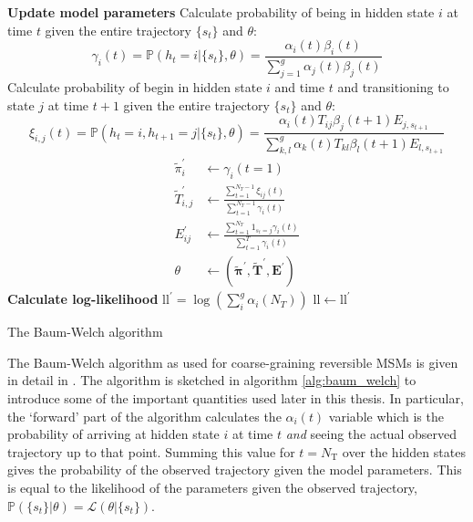 \begin{algorithm}
{{    \textbf{Update model parameters}\;
    Calculate probability of being in hidden state $i$ at time $t$ given the entire trajectory $\{s_{t}\}$ and  $\theta$:\;
    \begin{equation*}
    \gamma_{i}(t) = \mathbb{P}(h_t=i|\{s_t\}, \theta) = \frac{\alpha_{i}(t) \beta_{i}(t)}{\sum_{j=1}^{g} \alpha_{j}(t) \beta_{j}(t)}
    \end{equation*}
    Calculate probability of begin in hidden state $i$ and time $t$ and transitioning to state $j$ at time $t+1$ given the entire trajectory $\{s_{t}\}$ and  $\theta$:\;
    \begin{equation*}
        \xi_{i,j}(t) = \mathbb{P}(h_t=i, h_{t+1} = j|\{s_t\}, \theta) = \frac{\alpha_{i}(t)T_{ij}\beta_{j}(t+1)E_{j, s_{t+1}}}{\sum_{k, l}^{g}\alpha_{k}(t)T_{kl}\beta_{l}(t+1)E_{l, s_{t+1}}}
    \end{equation*}
    \begin{align*}
        \widetilde{\pi}_{i}^{\prime}  &\longleftarrow \gamma_{i}(t=1) \\
        \widetilde{T}_{i,j}^{\prime} & \longleftarrow \frac{\sum_{t=1}^{N_{T}-1} \xi_{i j}(t)}{\sum_{t=1}^{N_{T}-1} \gamma_{i}(t)} \\
        E_{ij}^{\prime} & \longleftarrow \frac{\sum_{t=1}^{N_{T}} 1_{s_{t}=j} \gamma_{i}(t)}{\sum_{t=1}^{T} \gamma_{i}(t)} \\
        \theta & \longleftarrow (\widetilde{\bm{\pi}}^{\prime}, \widetilde{\mathbf{T}}^{\prime}, \mathbf{E}^{\prime})
    \end{align*}
    \textbf{Calculate log-likelihood}\;
    $\mathrm{ll}^{\prime} = \log{\left(\sum_{i}^{g}\alpha_{i}(N_{T})\right)}$\;
    $\mathrm{ll} \longleftarrow \mathrm{ll}^{\prime}$\;
}
}
\caption{The Baum-Welch algorithm}
\end{algorithm}

The Baum-Welch algorithm as used for coarse-graining reversible MSMs is given in detail in \cite{noeProjectedHiddenMarkov2013a}. The algorithm is sketched in algorithm \ref{alg:baum_welch} to introduce some of the important quantities used later in this thesis. In particular, the `forward' part of the algorithm calculates the $\alpha_{i}(t)$ variable which is the probability of arriving at hidden state $i$ at time $t$ \emph{and} seeing the actual observed trajectory up to that point. Summing this value for $t=N_{\mathrm{T}}$ over the hidden states gives the probability of the observed trajectory given the model parameters. This is equal to the likelihood of the parameters given the observed trajectory, $\mathbb{P}(\{s_{t}\}|\theta)=\mathcal{L}(\theta|\{s_{t}\})$. 

